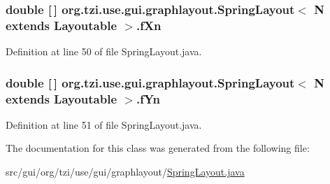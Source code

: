 \hypertarget{classorg_1_1tzi_1_1use_1_1gui_1_1graphlayout_1_1_spring_layout_3_01_n_01extends_01_layoutable_01_4_abbdd2c67458dbf95062c23d202ef8734}{
\subsubsection[{f\-Xn}]{\setlength{\rightskip}{0pt plus 5cm}double \mbox{[}$\,$\mbox{]} org.\-tzi.\-use.\-gui.\-graphlayout.\-Spring\-Layout$<$ N extends {\bf Layoutable} $>$.f\-Xn\hspace{0.3cm}{\ttfamily [protected]}}}\label{classorg_1_1tzi_1_1use_1_1gui_1_1graphlayout_1_1_spring_layout_3_01_n_01extends_01_layoutable_01_4_abbdd2c67458dbf95062c23d202ef8734}


Definition at line 50 of file Spring\-Layout.\-java.

\hypertarget{classorg_1_1tzi_1_1use_1_1gui_1_1graphlayout_1_1_spring_layout_3_01_n_01extends_01_layoutable_01_4_a482259a39063805d020e284b6463bf6e}{
\subsubsection[{f\-Yn}]{\setlength{\rightskip}{0pt plus 5cm}double \mbox{[}$\,$\mbox{]} org.\-tzi.\-use.\-gui.\-graphlayout.\-Spring\-Layout$<$ N extends {\bf Layoutable} $>$.f\-Yn\hspace{0.3cm}{\ttfamily [protected]}}}\label{classorg_1_1tzi_1_1use_1_1gui_1_1graphlayout_1_1_spring_layout_3_01_n_01extends_01_layoutable_01_4_a482259a39063805d020e284b6463bf6e}


Definition at line 51 of file Spring\-Layout.\-java.



The documentation for this class was generated from the following file\-:\begin{DoxyCompactItemize}
\item 
src/gui/org/tzi/use/gui/graphlayout/\hyperlink{_spring_layout_8java}{Spring\-Layout.\-java}\end{DoxyCompactItemize}

